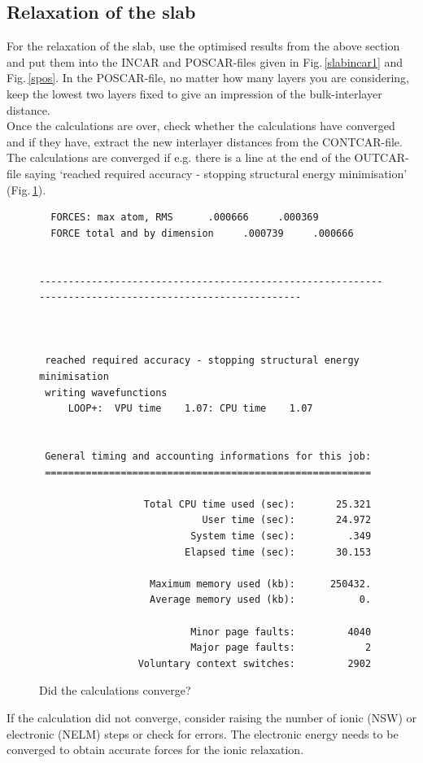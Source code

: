 \documentclass[twoside, 11pt, titlepage, captions=nooneline, a4paper, headsepline]{scrbook}%
\begin{document}
\subsection{Relaxation of the slab}
For the relaxation of the slab, use the optimised results from the above section and put them into the INCAR and POSCAR-files given in Fig.\,\ref{slabincar1} and Fig.\,\ref{spos}. In the POSCAR-file, no matter how many layers you are considering, keep the lowest two layers fixed to give an impression of the bulk-interlayer distance.\\
Once the calculations are over, check whether the calculations have converged and if they have, extract the new interlayer distances from the CONTCAR-file. The calculations are converged if e.g. there is a line at the end of the OUTCAR-file saying `reached required accuracy - stopping structural energy minimisation' (Fig.\,\ref{sconv}).
\begin{figure}[h!!]
\begin{verbatim}
  FORCES: max atom, RMS      .000666     .000369
  FORCE total and by dimension     .000739     .000666


--------------------------------------------------------------------------------------------------------



 reached required accuracy - stopping structural energy minimisation
 writing wavefunctions
     LOOP+:  VPU time    1.07: CPU time    1.07


 General timing and accounting informations for this job:
 ========================================================

                  Total CPU time used (sec):       25.321
                            User time (sec):       24.972
                          System time (sec):         .349
                         Elapsed time (sec):       30.153

                   Maximum memory used (kb):      250432.
                   Average memory used (kb):           0.

                          Minor page faults:         4040
                          Major page faults:            2
                 Voluntary context switches:         2902                                                 
\end{verbatim}
\caption{Did the calculations converge?}
\label{sconv}
\end{figure}
If the calculation did not converge, consider raising the number of ionic (NSW) or electronic (NELM) steps or check for errors. The electronic energy needs to be converged to obtain accurate forces for the ionic relaxation.\\
\end{document}
